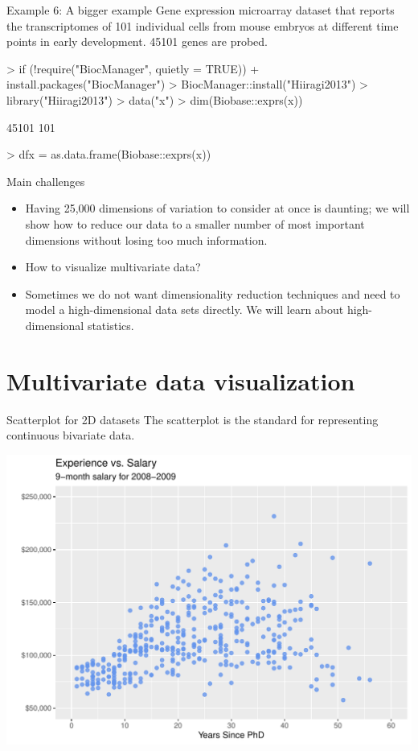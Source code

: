 \documentclass[11pt,handout,aspectratio=169]{beamer}
\begin{document}
\begin{frame}[fragile]{Example 6: A bigger example }
Gene expression microarray dataset that reports the transcriptomes of 101 individual cells from mouse embryos at different time points in early development. 45101 genes are probed.
\scriptsize
\begin{Schunk}
\begin{Sinput}
> if (!require("BiocManager", quietly = TRUE))
+     install.packages("BiocManager")
> BiocManager::install("Hiiragi2013")
> library("Hiiragi2013")
> data("x")
> dim(Biobase::exprs(x))
\end{Sinput}
\begin{Soutput}
[1] 45101   101
\end{Soutput}
\begin{Sinput}
> dfx = as.data.frame(Biobase::exprs(x))
\end{Sinput}
\end{Schunk}
\end{frame}

\begin{frame}{Main challenges}
\begin{itemize}
	\item Having 25{,}000 dimensions of variation to consider at once is daunting; we will show how to reduce our data to a smaller number of most important dimensions without losing too much information.
	\item How to visualize multivariate data?
	\item Sometimes we do not want dimensionality reduction techniques and need to model a high-dimensional data sets directly. We will learn about high-dimensional statistics. 
\end{itemize}	
\end{frame}
 
\section{Multivariate data visualization}

\begin{frame}[fragile]{Scatterplot for 2D datasets}
	The scatterplot is the standard for representing continuous bivariate data.
	{\scriptsize
\begin{center}
\includegraphics[width=.6\textwidth]{pics/plot1.1.pdf}		
\end{center}}
\end{frame}
\end{document}
